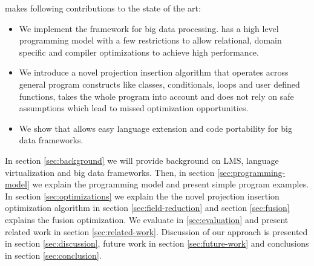 \tool makes following contributions to the state of the art:    
\begin{itemize}

  \item We implement the \tool framework for big data processing. \tool has a high level programming model with a few restrictions to allow relational, domain specific and compiler optimizations to achieve high performance.

  \item We introduce a novel projection insertion algorithm that operates across general program constructs like classes, conditionals, loops and user defined functions, takes the whole program into account and does not rely on safe assumptions which lead to missed optimization opportunities.  

  \item We show that \tool allows easy language extension and code portability for big data frameworks. 

\end{itemize} 

In section \ref{sec:background} we will provide background on LMS, language virtualization and big data frameworks. Then, in section \ref{sec:programming-model} we explain the programming model and present simple program examples. In section \ref{sec:optimizations} we explain the the novel projection insertion optimization algorithm in section \ref{sec:field-reduction} and section \ref{sec:fusion} explains the fusion optimization. We evaluate \tool in \ref{sec:evaluation} and present related work in section \ref{sec:related-work}. Discussion of our approach is presented in section \ref{sec:discussion}, future work in section \ref{sec:future-work} and conclusions in section \ref{sec:conclusion}.

